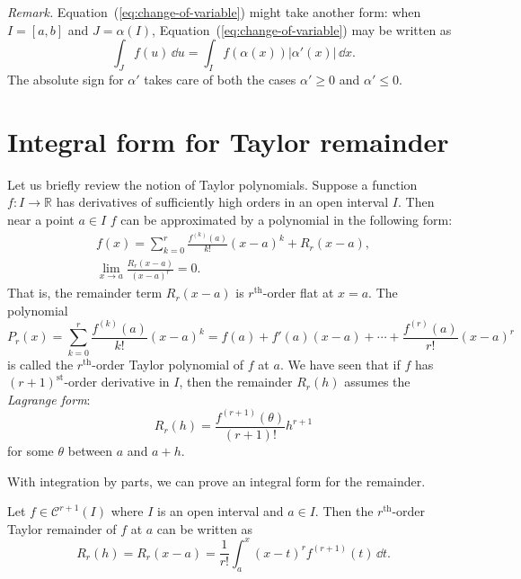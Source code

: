 \noindent\textit{Remark.} Equation~(\ref{eq:change-of-variable}) might take another form: when $I = [a,b]$ and $J = \alpha(I)$, Equation~(\ref{eq:change-of-variable}) may be written as
\[
  \int_J f(u) \, \dd u = \int_I f(\alpha(x)) |\alpha'(x)| \, \dd x.
\]
The absolute sign for $\alpha'$ takes care of both the cases $\alpha' \geqslant 0$ and $\alpha' \leqslant 0$.

\section{Integral form for Taylor remainder}
\label{sec:taylor-integral}

Let us briefly review the notion of Taylor polynomials.
Suppose a function $f : I \to \mathbb{R}$ has derivatives of sufficiently high orders in an open interval $I$.
Then near a point $a \in I$ $f$ can be approximated by a polynomial in the following form:
\begin{gather*}
  f(x) = \sum_{k=0}^r \frac{ f^{(k)}(a) }{ k! } (x - a)^k + R_r(x-a), \\
  \lim_{x \to a} \frac{ R_r(x-a) }{ (x-a)^r }  = 0.
\end{gather*}
That is, the remainder term $R_r(x-a)$ is $r^{\text{th}}$-order flat at $x = a$. 
The polynomial
\[
  P_r(x) = \sum_{k=0}^r \frac{ f^{(k)}(a) }{k!} (x-a)^k = f(a) + f'(a) (x-a) + \cdots + \frac{f^{(r)}(a)}{r!} (x-a)^r
\]
is called the $r^{\text{th}}$-order Taylor polynomial of $f$ at $a$.
We have seen that if $f$ has $(r+1)^{\text{st}}$-order derivative in $I$, then the remainder $R_r(h)$ assumes the {\em Lagrange form}:
\[
  R_r(h) = \frac{ f^{(r+1)}(\theta) }{(r+1)!} h^{r+1}
\]
for some $\theta$ between $a$ and $a+h$.

With integration by parts, we can prove an integral form for the remainder.
\begin{thm}
  Let $f \in \mathcal{C}^{r+1}(I)$ where $I$ is an open interval and $a \in I$.
  Then the $r^{\text{th}}$-order Taylor remainder of $f$ at $a$ can be written as
  \begin{equation}
    \label{eq:remainder-integral}
    R_r(h) = R_r(x-a) = \frac{1}{r!} \int_a^x (x-t)^{r} f^{(r+1)}(t) \, \dd t.
  \end{equation}
\end{thm}

